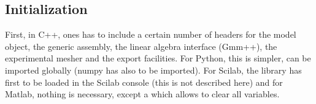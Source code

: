 \documentclass[a4paper,11pt,english]{sphinxmanual}
\begin{document}
\subsection{Initialization}
\label{\detokenize{tutorial/thermo_coupling:initialization}}
\sphinxAtStartPar
First, in C++, ones has to include a certain number of headers for the model object, the generic assembly, the linear algebra interface (Gmm++), the experimental mesher and the export facilities. For Python, this is simpler,  can be imported globally (numpy has also to be imported). For Scilab, the library has first to be loaded in the Scilab console (this is not described here) and for Matlab, nothing is necessary, except a  which allows to clear all  variables.
\end{document}
